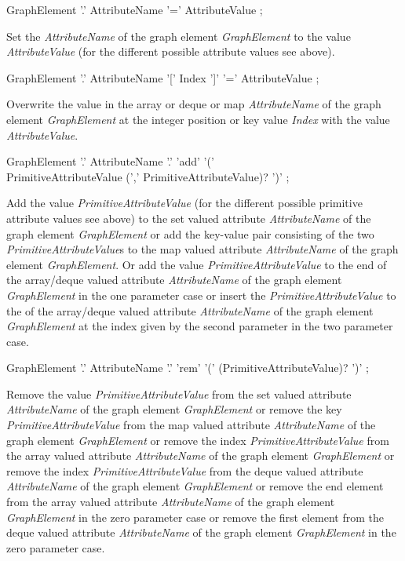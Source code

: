 \begin{rail}
  GraphElement '.' AttributeName '=' AttributeValue ;
\end{rail}
Set the  \emph{AttributeName} of the graph element \emph{GraphElement} to the value \emph{AttributeValue} (for the different possible attribute values see above).

\begin{rail}
  GraphElement '.' AttributeName '[' Index ']' '=' AttributeValue ;
\end{rail}
Overwrite the value in the array or deque or map  \emph{AttributeName} of the graph element \emph{GraphElement} at the integer position or key value \emph{Index} with the value \emph{AttributeValue}.

\begin{rail}
  GraphElement '.' AttributeName '.' 'add' '(' \\
  	PrimitiveAttributeValue (',' PrimitiveAttributeValue)? ')' ;
\end{rail}
Add the value \emph{PrimitiveAttributeValue} (for the different possible primitive attribute values see above) to the set valued attribute \emph{AttributeName} of the graph element \emph{GraphElement} or add the key-value pair consisting of the two \emph{PrimitiveAttributeValue}s to the map valued attribute \emph{AttributeName} of the graph element \emph{GraphElement}.
Or add the value \emph{PrimitiveAttributeValue} to the end of the array/deque valued attribute \emph{AttributeName} of the graph element \emph{GraphElement} in the one parameter case or insert the \emph{PrimitiveAttributeValue} to the of the array/deque valued attribute \emph{AttributeName} of the graph element \emph{GraphElement} at the index given by the second parameter in the two parameter case.

\begin{rail}
  GraphElement '.' AttributeName '.' 'rem' '(' (PrimitiveAttributeValue)? ')' ;
\end{rail}
Remove the value \emph{PrimitiveAttributeValue} from the set valued attribute \emph{AttributeName} of the graph element \emph{GraphElement} or remove the key \emph{PrimitiveAttributeValue} from the map valued attribute \emph{AttributeName} of the graph element \emph{GraphElement} or remove the index \emph{PrimitiveAttributeValue} from the array valued attribute \emph{AttributeName} of the graph element \emph{GraphElement} or remove the index \emph{PrimitiveAttributeValue} from the deque valued attribute \emph{AttributeName} of the graph element \emph{GraphElement} or remove the end element from the array valued attribute \emph{AttributeName} of the graph element \emph{GraphElement} in the zero parameter case or remove the first element from the deque valued attribute \emph{AttributeName} of the graph element \emph{GraphElement} in the zero parameter case.


